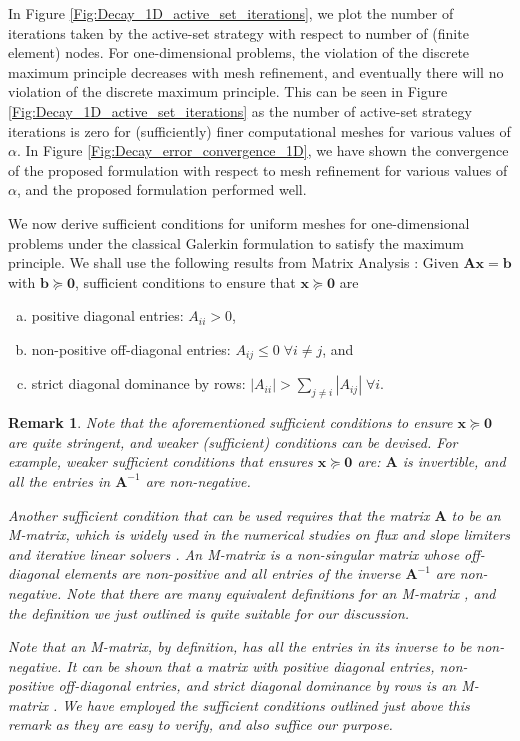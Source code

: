 \documentclass[11pt]{amsart}
\newtheorem{remark}[theorem]{Remark}
\begin{document}
In Figure \ref{Fig:Decay_1D_active_set_iterations}, we plot the number of iterations taken 
by the active-set strategy with respect to number of (finite element) nodes. For one-dimensional 
problems, the violation of the discrete maximum principle decreases with mesh refinement, and 
eventually there will no violation of the discrete maximum principle. This can be seen in Figure 
\ref{Fig:Decay_1D_active_set_iterations} as the number of active-set strategy iterations is zero 
for (sufficiently) finer computational meshes for various values of $\alpha$.  In Figure 
\ref{Fig:Decay_error_convergence_1D}, we have shown the convergence of the proposed 
formulation with respect to mesh refinement for various values of $\alpha$, and the 
proposed formulation performed well. 

We now derive sufficient conditions for uniform meshes for one-dimensional problems under 
the classical Galerkin formulation to satisfy the maximum principle. We shall use the following 
results from Matrix Analysis \cite{Quarteroni_Numerical_Mathematics,Varga_Matrix_Iterative_Analysis}: 
Given $\boldsymbol{A} \boldsymbol{x} = \boldsymbol{b}$ with $\boldsymbol{b} \succeq \boldsymbol{0}$, 
sufficient conditions to ensure that $\boldsymbol{x} \succeq \boldsymbol{0}$ are
\begin{enumerate}[(a)]
  \item positive diagonal entries: $A_{ii} > 0$, 
  \item non-positive off-diagonal entries: $A_{ij} \leq 0 \; \forall i \neq j$, and 
  \item strict diagonal dominance by rows: $|A_{ii}| > \sum_{j \neq i} |A_{ij}| \; \forall i$.
\end{enumerate}
\begin{remark}
Note that the aforementioned sufficient conditions to ensure $\boldsymbol{x} \succeq \boldsymbol{0}$ 
are quite stringent, and weaker (sufficient) conditions can be devised. For example, weaker sufficient 
conditions that ensures $\boldsymbol{x} \succeq \boldsymbol{0}$ are: $\boldsymbol{A}$ is invertible, 
and all the entries in $\boldsymbol{A}^{-1}$ are non-negative. 

Another sufficient condition that can be used requires that the matrix $\boldsymbol{A}$ to 
be an M-matrix, which is widely used in the numerical studies on flux and slope limiters 
\cite{Kuzmin_Turek_JCP_2002_v175_p525} and iterative linear solvers \cite{Saad}. An M-matrix 
is a non-singular matrix whose off-diagonal elements are non-positive and all entries of the 
inverse $\boldsymbol{A}^{-1}$ are non-negative. Note that there are many equivalent definitions 
for an M-matrix \cite{Saad,Varga_Matrix_Iterative_Analysis}, and the definition we just outlined 
is quite suitable for our discussion. 

Note that an M-matrix, by definition, has all the entries in its inverse to be non-negative. 
It can be shown that a matrix with positive diagonal entries, non-positive off-diagonal entries, 
and strict diagonal dominance by rows is an M-matrix \cite{Quarteroni_Numerical_Mathematics}. 
We have employed the sufficient conditions outlined just above this remark as they are easy to 
verify, and also suffice our purpose. 
\end{remark}
\end{document}
